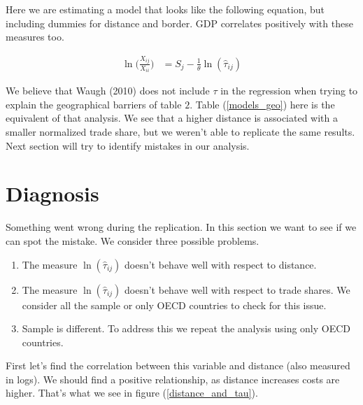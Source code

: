 \documentclass[a4paper,12pt]{article}
\begin{document}
 Here we are estimating a model that looks like the following equation, but including dummies for distance and border. GDP correlates positively with these measures too. 
 
 \begin{align}
     \ln\bigg(\frac{X_{ij}}{X_{ii}}\bigg) & =  S_j - \frac{1}{\theta} \ln(\hat{\tau}_{ij})
 \end{align}
 
 We believe that Waugh (2010) does not include $\tau$ in the regression when trying to explain the geographical barriers of table $2$. Table (\ref{models_geo}) here is the equivalent of that analysis. We see that a higher distance is associated with a smaller normalized trade share, but we weren't able to replicate the same results. Next section will try to identify mistakes in our analysis. 
 
 
 
 \section{Diagnosis}
 
 Something went wrong during the replication. In this section we want to see if we can spot the mistake. We consider three possible problems. 
 
 \begin{enumerate}
     \item The measure $\ln(\hat{\tau}_{ij})$ doesn't behave well with respect to distance. 
     \item The measure $\ln(\hat{\tau}_{ij})$ doesn't behave well with respect to trade shares. We consider all the sample or only OECD countries to check for this issue. 
     \item Sample is different. To address this we repeat the analysis using only OECD countries. 
 \end{enumerate}
 
 
 First let's find the correlation between this variable and distance (also measured in logs). We should find a positive relationship, as distance increases costs are higher. That's what we see in figure (\ref{distance_and_tau}). 
 
\end{document}
